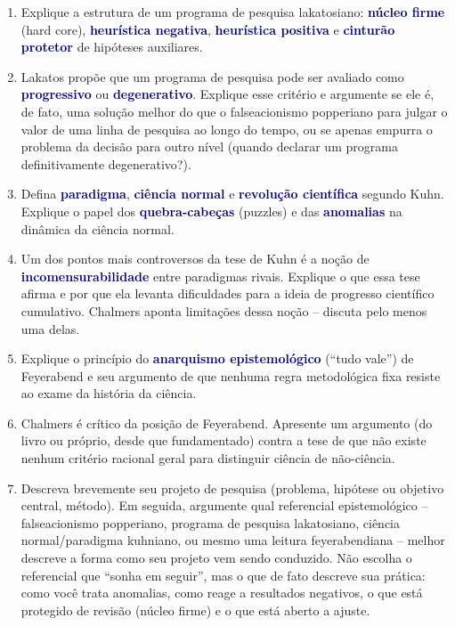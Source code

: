 \documentclass[10pt]{extarticle}
\newcommand{\impt}[1]{\textcolor{darkblue}{\textbf{#1}}}
\begin{document}
\begin{enumerate}
\item Explique a estrutura de um programa de pesquisa lakatosiano: \impt{núcleo firme} (hard core), \impt{heurística negativa}, \impt{heurística positiva} e \impt{cinturão protetor} de hipóteses auxiliares.
\item Lakatos propõe que um programa de pesquisa pode ser avaliado como \impt{progressivo} ou \impt{degenerativo}. Explique esse critério e argumente se ele é, de fato, uma solução melhor do que o falseacionismo popperiano para julgar o valor de uma linha de pesquisa ao longo do tempo, ou se apenas empurra o problema da decisão para outro nível (quando declarar um programa definitivamente degenerativo?).





\item Defina \impt{paradigma}, \impt{ciência normal} e \impt{revolução científica} segundo Kuhn. Explique o papel dos \impt{quebra-cabeças} (puzzles) e das \impt{anomalias} na dinâmica da ciência normal.
\item Um dos pontos mais controversos da tese de Kuhn é a noção de \impt{incomensurabilidade} entre paradigmas rivais. Explique o que essa tese afirma e por que ela levanta dificuldades para a ideia de progresso científico cumulativo. Chalmers aponta limitações dessa noção -- discuta pelo menos uma delas.





\item Explique o princípio do \impt{anarquismo epistemológico} (``tudo vale'') de Feyerabend e seu argumento de que nenhuma regra metodológica fixa resiste ao exame da história da ciência.
\item Chalmers é crítico da posição de Feyerabend. Apresente um argumento (do livro ou próprio, desde que fundamentado) contra a tese de que não existe nenhum critério racional geral para distinguir ciência de não-ciência.


\item Descreva brevemente seu projeto de pesquisa (problema, hipótese ou objetivo central, método). Em seguida, argumente qual referencial epistemológico -- falseacionismo popperiano, programa de pesquisa lakatosiano, ciência normal/paradigma kuhniano, ou mesmo uma leitura feyerabendiana -- melhor descreve a forma como seu projeto vem sendo conduzido. Não escolha o referencial que ``sonha em seguir'', mas o que de fato descreve sua prática: como você trata anomalias, como reage a resultados negativos, o que está protegido de revisão (núcleo firme) e o que está aberto a ajuste.



\end{enumerate}
\end{document}
